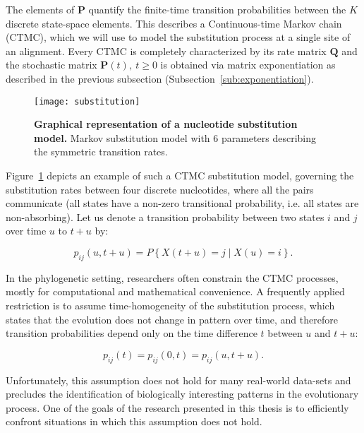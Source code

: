 The elements of $\mathbf{P}$ quantify the finite-time transition probabilities between the $K$ discrete state-space elements.
This describes a Continuous-time Markov chain (CTMC), which  we will use to model the substitution process at a single site of an alignment.
Every CTMC is completely characterized by its rate matrix $\mathbf{Q}$ and the stochastic matrix $\mathbf{P}(t),\ t\geq0$ is obtained via matrix exponentiation as described in the previous subsection (Subsection~\ref{sub:exponentiation}).

\begin{figure}[H]
\centering
\texttt{[image: substitution]} 
\caption{
{ \footnotesize 
{\bf  Graphical representation of a nucleotide substitution model.} 
Markov substitution model with 6 parameters describing the symmetric transition rates.
} %
}
\label{fig:substitution}
\end{figure}

Figure~\ref{fig:substitution} depicts an example of such a CTMC substitution model, governing the substitution rates between four discrete nucleotides, where all the pairs communicate (all states have a non-zero transitional probability, i.e. all states are non-absorbing).
Let us denote a transition probability between two states $i$ and $j$ over time $u$ to $t+u$ by:

\begin{equation}
p_{ij}\left(u,t+u\right)=P\left\{ X(t+u)=j\mid X(u)=i\right\} .
\end{equation}

In the phylogenetic setting, researchers often constrain the CTMC processes, mostly for computational and mathematical convenience.
A frequently applied restriction is to assume time-homogeneity of the substitution process, which states that the evolution does not change in pattern over time, and therefore transition probabilities depend only on the time difference $t$ between $u$ and $t + u$:

\begin{equation}
p_{ij}\left(t\right) = p_{ij}\left(0,t\right) = p_{ij}\left(u,t+u\right).
\label{eq:time_homogeneity}
\end{equation}

Unfortunately, this assumption does not hold for many real-world data-sets and precludes the identification of biologically interesting patterns in the evolutionary process. %
One of the goals of the research presented in this thesis is to efficiently confront situations in which this assumption does not hold.

